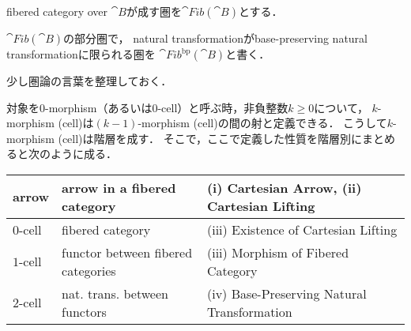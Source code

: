 \documentclass[a4paper, dvipdfmx]{jsarticle}
\newcommand{\Fib}[1]{\cat{Fib}(\cat{#1})}
\newcommand{\FibBP}[1]{\cat{Fib}^{\mathrm{bp}}(\cat{#1})}
\begin{document}
\begin{Def}
\begin{myenum}
\item
    fibered category over $\cat{B}$が成す圏を$\Fib{B}$とする．
\item
    $\Fib{B}$の部分圏で，
    natural transformationがbase-preserving natural transformationに限られる圏を
    $\FibBP{B}$と書く．
\end{myenum}
\end{Def}

\begin{Remark}
    少し圏論の言葉を整理しておく．

    対象を$0$-morphism（あるいは$0$-cell）と呼ぶ時，非負整数$k \geq 0$について，
    $k$-morphism (cell)は$(k-1)$-morphism (cell)の間の射と定義できる．
    こうして$k$-morphism (cell)は階層を成す．
    そこで，ここで定義した性質を階層別にまとめると次のように成る．
    \begin{center}
    \begin{tabular}{l|l|l}
        \hline
        arrow& arrow in a fibered category & (i) Cartesian Arrow, (ii) Cartesian Lifting \\ \hline
        $0$-cell& fibered category & (iii) Existence of Cartesian Lifting \\ \hline
        $1$-cell& functor between fibered categories & (iii) Morphism of Fibered Category \\ \hline
        $2$-cell& nat. trans. between functors & (iv) Base-Preserving Natural Transformation \\
        \hline
    \end{tabular}
    \end{center}


\end{Remark}
\end{document}
